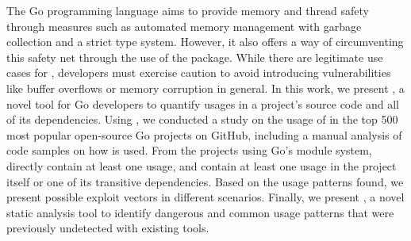The Go programming language aims to provide memory and thread safety through measures such as automated memory management with garbage collection and a strict type system.
However, it also offers a way of circumventing this safety net through the use of the \unsafe{} package.
While there are legitimate use cases for \unsafe{}, developers must exercise caution to avoid introducing vulnerabilities like buffer overflows or memory corruption in general.
In this work, we present \toolUsage{}, a novel tool for Go developers to quantify \unsafe{} usages in a project's source code and all of its dependencies.
Using \toolUsage{}, we conducted a study on the usage of \unsafe{} in the top 500 most popular open-source Go projects on GitHub, including a manual analysis of \numberCodeSnippets{} code samples on how \unsafe{} is used.
From the projects using Go's module system, %
\percentageProjectsWithUnsafe{} %
directly contain at least one \unsafe{} usage,
and \percentageProjectsAndDependenciesUnsafe{} contain at least one \unsafe{} usage in the project itself or one of its transitive dependencies.
Based on the usage patterns found, we present possible exploit vectors in different scenarios. 
Finally, we present \toolSA{}, a novel static analysis tool to identify dangerous and common usage patterns that were previously undetected with existing tools.

